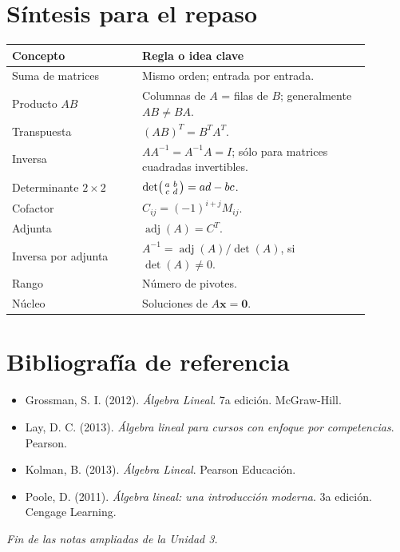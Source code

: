 \documentclass[12pt]{article}
\theoremstyle{remark}
\newcommand{\adj}{\operatorname{adj}}
\newcommand{\vect}[1]{\boldsymbol{#1}}
\begin{document}
\section{Síntesis para el repaso}
\begin{center}
\renewcommand{\arraystretch}{1.35}
\begin{tabular}{>{\raggedright\arraybackslash}p{0.32\linewidth}>{\raggedright\arraybackslash}p{0.57\linewidth}}
\toprule
\textbf{Concepto} & \textbf{Regla o idea clave}\\\midrule
Suma de matrices & Mismo orden; entrada por entrada.\\
Producto $AB$ & Columnas de $A$ = filas de $B$; generalmente $AB\ne BA$.\\
Transpuesta & $(AB)^T=B^TA^T$.\\
Inversa & $AA^{-1}=A^{-1}A=I$; sólo para matrices cuadradas invertibles.\\
Determinante $2\times2$ & $\det\begin{psmallmatrix}a&b\\c&d\end{psmallmatrix}=ad-bc$.\\
Cofactor & $C_{ij}=(-1)^{i+j}M_{ij}$.\\
Adjunta & $\adj(A)=C^T$.\\
Inversa por adjunta & $A^{-1}=\adj(A)/\det(A)$, si $\det(A)\ne0$.\\
Rango & Número de pivotes.\\
Núcleo & Soluciones de $A\vect x=\vect0$.\\\bottomrule
\end{tabular}
\end{center}

\section{Bibliografía de referencia}
\begin{itemize}
\item Grossman, S. I. (2012). \emph{Álgebra Lineal}. 7a edición. McGraw-Hill.
\item Lay, D. C. (2013). \emph{Álgebra lineal para cursos con enfoque por competencias}. Pearson.
\item Kolman, B. (2013). \emph{Álgebra Lineal}. Pearson Educación.
\item Poole, D. (2011). \emph{Álgebra lineal: una introducción moderna}. 3a edición. Cengage Learning.
\end{itemize}

\vspace{0.8em}\begin{center}\textit{Fin de las notas ampliadas de la Unidad 3.}\end{center}
\end{document}
